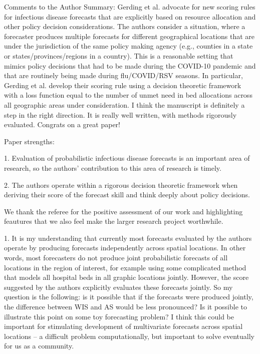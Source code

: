 \documentclass{article}
\begin{document}
\begin{quotebar}
Comments to the Author
Summary:
Gerding et al. advocate for new scoring rules for infectious disease forecasts that are explicitly based on resource allocation and other policy decision considerations. The authors consider a situation, where a forecaster produces multiple forecasts for different geographical locations that are under the jurisdiction of the same policy making agency (e.g., counties in a state or states/provinces/regions in a country). This is a reasonable setting that mimics policy decisions that had to be made during the COVID-10 pandemic and that are routinely being made during flu/COVID/RSV seasons. In particular, Gerding et al. develop their scoring rule using a decision theoretic framework with a loss function equal to the number of unmet need in bed allocations across all geographic areas under consideration. I think the manuscript is definitely a step in the right direction. It is really well written, with methods rigorously evaluated. Congrats on a great paper!


Paper strengths:

1. Evaluation of probabilistic infectious disease forecasts is an important area of research, so the authors' contribution to this area of research is timely.

2. The authors operate within a rigorous decision theoretic framework when deriving their score of the forecast skill and think deeply about policy decisions. 
\end{quotebar}

We thank the referee for the positive assessment of our work and highlighting feautures that we also feel make the larger research project worthwhile.

\begin{quotebar}
1. It is my understanding that currently most forecasts evaluated by the authors operate by producing forecasts independently across spatial locations. In other words, most forecasters do not produce joint probabilistic forecasts of all locations in the region of interest, for example using some complicated method that models all hospital beds in all graphic locations jointly. However, the score suggested by the authors explicitly evaluates these forecasts jointly. So my question is the following: is it possible that if the forecasts were produced jointly, the difference between WIS and AS would be less pronounced? Is it possible to illustrate this point on some toy forecasting problem? I think this could be important for stimulating development of multivariate forecasts across spatial locations -- a difficult problem computationally, but important to solve eventually for us as a community.
\end{quotebar}
\end{document}
